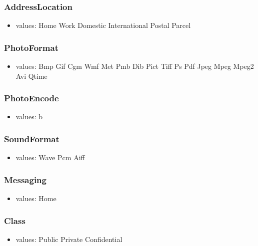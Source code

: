 \documentclass[a4paper,11pt]{article}
\begin{document}
\subsubsection{AddressLocation}
\begin{itemize}
  \item values:
  \subitem Home
  \subitem Work
  \subitem Domestic
  \subitem International
  \subitem Postal
  \subitem Parcel
\end{itemize}

\subsubsection{PhotoFormat}
\begin{itemize}
  \item values:
  \subitem Bmp
  \subitem Gif
  \subitem Cgm
  \subitem Wmf
  \subitem Met
  \subitem Pmb
  \subitem Dib
  \subitem Pict
  \subitem Tiff
  \subitem Ps
  \subitem Pdf
  \subitem Jpeg
  \subitem Mpeg
  \subitem Mpeg2
  \subitem Avi
  \subitem Qtime
\end{itemize}

\subsubsection{PhotoEncode}
\begin{itemize}
  \item values:
  \subitem b
\end{itemize}

\subsubsection{SoundFormat}
\begin{itemize}
  \item values:
  \subitem Wave
  \subitem Pcm
  \subitem Aiff
\end{itemize}

\subsubsection{Messaging}
\begin{itemize}
  \item values:
  \subitem Home
\end{itemize}

\subsubsection{Class}
\begin{itemize}
  \item values:
  \subitem Public
  \subitem Private
  \subitem Confidential
\end{itemize}
\end{document}
